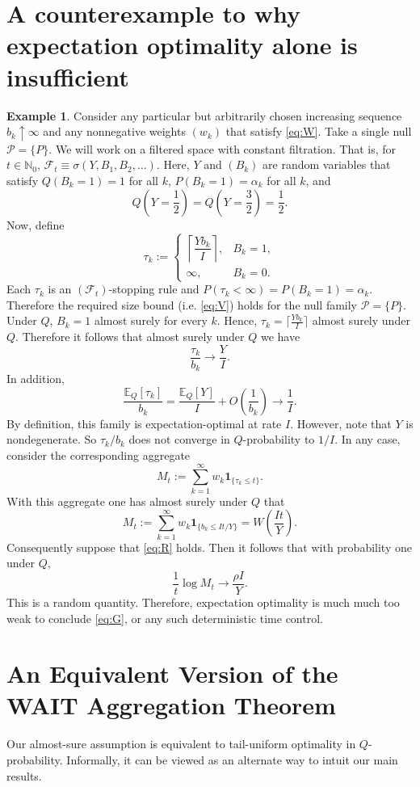\documentclass{article}
\newcommand{\NN}{\mathbb N}
\newcommand{\PP}{\mathcal P}
\newcommand{\ind}[1]{\mathbf{1}_{\{#1\}}}
\newcommand{\EE}{\mathbb E}
\theoremstyle{definition}
\newtheorem{example}[theorem]{Example}
\begin{document}
\appendix
\section{A counterexample to why expectation optimality alone is insufficient}
\begin{example}\label{ex:expectation-too-weak}
Consider any particular but arbitrarily chosen increasing sequence $b_k\uparrow\infty$ and any nonnegative weights $(w_k)$ that satisfy \eqref{eq:W}. Take a single null $\PP=\{P\}$. We will work on a filtered space with constant filtration. That is, for $t\in\NN_0$, $\mathcal F_t\equiv\sigma(Y,B_1,B_2,\dots)$. Here, $Y$ and $(B_k)$ are random variables that satisfy $Q(B_k=1)=1$ for all $k$, $P(B_k=1)=\alpha_k$ for all $k$, and 
\[
Q\left(Y=\frac{1}{2}\right)=Q\left(Y=\frac{3}{2}\right)=\frac12.
\]
Now, define
\[
\tau_k:=
\begin{cases}
\left\lceil \dfrac{Yb_k}{I}\right\rceil,&B_k=1,\\
\infty,&B_k=0.
\end{cases}
\]
Each $\tau_k$ is an $(\mathcal F_t)$-stopping rule and $P(\tau_k<\infty)=P(B_k=1)=\alpha_k$. Therefore the required size bound (i.e. \eqref{eq:V}) holds for the null family $\PP=\{P\}$. Under $Q$, $B_k=1$ almost surely for every $k$. Hence, $\tau_k=\lceil\frac{Yb_k}{I}\rceil$ almost surely under $Q$. Therefore it follows that almost surely under $Q$ we have
\[
\frac{\tau_k}{b_k}\longrightarrow \frac{Y}{I}.
\]
In addition,
\[
\frac{\EE_Q[\tau_k]}{b_k}=\frac{\EE_Q[Y]}{I}+O\left(\frac{1}{b_k}\right)\longrightarrow \frac{1}{I}.
\]
By definition, this family is expectation-optimal at rate $I$. However, note that $Y$ is nondegenerate. So $\tau_k/b_k$ does not converge in $Q$-probability to $1/I$. In any case, consider the corresponding aggregate
\[
M_t:=\sum_{k=1}^\infty w_k\ind{\tau_k\le t}.
\]
With this aggregate one has almost surely under $Q$ that
\[
M_t:=\sum_{k=1}^\infty w_k \ind{b_k\le It/Y}=W\left(\frac{It}{Y}\right).
\]
Consequently suppose that \eqref{eq:R} holds. Then it follows that with probability one under $Q$,
\[
\frac{1}{t}\log M_t\longrightarrow \frac{\rho I}{Y}.
\]
This is a random quantity. Therefore, expectation optimality is much much too weak to conclude \eqref{eq:G}, or any such deterministic time control.
\end{example}

\section{An Equivalent Version of the WAIT Aggregation Theorem}
Our almost-sure assumption is equivalent to tail-uniform optimality in $Q$-probability. Informally, it can be viewed as an alternate way to intuit our main results.
\end{document}
